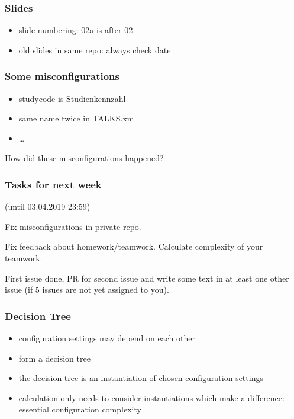 \begin{frame}
	\frametitle{Slides}
	\begin{itemize}
	\item slide numbering: 02a is after 02
	\item old slides in same repo: always check date
	\end{itemize}
\end{frame}

\begin{frame}
	\frametitle{Some misconfigurations}
	\begin{itemize}
	\item studycode is Studienkennzahl
	\item same name twice in TALKS.xml
	\item \dots
	\end{itemize}

	\begin{task}
	How did these misconfigurations happened?
	\end{task}
\end{frame}

\begin{assignment}
	\frametitle{Tasks for next week}
	(until 03.04.2019 23:59)

	\begin{task}
	Fix misconfigurations in private repo.
	\end{task}

	\begin{task}
	Fix feedback about homework/teamwork.
	Calculate complexity of your teamwork.
	\end{task}

	\begin{task}
	First issue done, PR for second issue and write some text in at least one other issue (if 5 issues are not yet assigned to you).
	\end{task}
\end{assignment}









\begin{frame}
	\frametitle{Decision Tree}
	\begin{itemize}
	\item configuration settings may depend on each other
	\item form a decision tree~\cite{reiser2009cvm,czarnecki2012cool}
	\item the decision tree is an instantiation of chosen configuration settings
	\item calculation only needs to consider instantiations which make a difference: \\
	essential configuration complexity~\cite{meinicke2016essential}
	\end{itemize}
\end{frame}



\nocite{raab2017introducing}

\appendix

\begin{frame}[allowframebreaks]
	
	
\end{frame}





